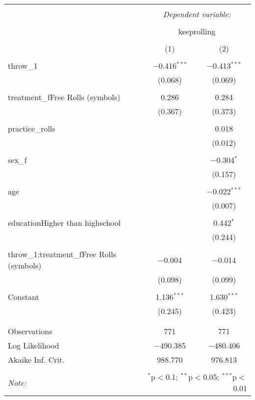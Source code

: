
\begin{table}[!htbp] \centering 
  \caption{} 
  \label{} 
\begin{tabular}{@{\extracolsep{5pt}}lcc} 
\\[-1.8ex]\hline 
\hline \\[-1.8ex] 
 & \multicolumn{2}{c}{\textit{Dependent variable:}} \\ 
\cline{2-3} 
\\[-1.8ex] & \multicolumn{2}{c}{keeprolling} \\ 
\\[-1.8ex] & (1) & (2)\\ 
\hline \\[-1.8ex] 
 throw\_1 & $-$0.416$^{***}$ & $-$0.413$^{***}$ \\ 
  & (0.068) & (0.069) \\ 
  & & \\ 
 treatment\_fFree Rolls (symbols) & 0.286 & 0.284 \\ 
  & (0.367) & (0.373) \\ 
  & & \\ 
 practice\_rolls &  & 0.018 \\ 
  &  & (0.012) \\ 
  & & \\ 
 sex\_f &  & $-$0.304$^{*}$ \\ 
  &  & (0.157) \\ 
  & & \\ 
 age &  & $-$0.022$^{***}$ \\ 
  &  & (0.007) \\ 
  & & \\ 
 educationHigher than highschool &  & 0.442$^{*}$ \\ 
  &  & (0.244) \\ 
  & & \\ 
 throw\_1:treatment\_fFree Rolls (symbols) & $-$0.004 & $-$0.014 \\ 
  & (0.098) & (0.099) \\ 
  & & \\ 
 Constant & 1.136$^{***}$ & 1.630$^{***}$ \\ 
  & (0.245) & (0.423) \\ 
  & & \\ 
\hline \\[-1.8ex] 
Observations & 771 & 771 \\ 
Log Likelihood & $-$490.385 & $-$480.406 \\ 
Akaike Inf. Crit. & 988.770 & 976.813 \\ 
\hline 
\hline \\[-1.8ex] 
\textit{Note:}  & \multicolumn{2}{r}{$^{*}$p$<$0.1; $^{**}$p$<$0.05; $^{***}$p$<$0.01} \\ 
\end{tabular} 
\end{table} 
